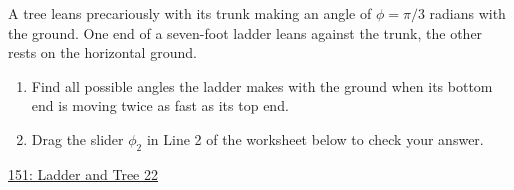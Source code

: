 \documentclass{ximera}
\begin{document}
\begin{question}  \label{Qsdafdsfhggg}
A tree leans precariously with its trunk making an angle of $\phi = \pi/3$ radians with the ground. One end of a seven-foot ladder leans against the trunk, the other rests on the horizontal ground.

\begin{enumerate}
\item Find all possible angles the ladder makes with the ground when its bottom end is moving twice as fast as its top end.

\item Drag the slider $\phi_2$ in Line 2 of the worksheet below to check your answer. 
\end{enumerate}

 
\begin{onlineOnly}
   \begin{center}
\end{center}
\end{onlineOnly}

\href{https://www.desmos.com/calculator/oftz4vb9qj}{151: Ladder and Tree 22}

\end{question}
\end{document}
